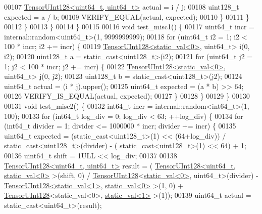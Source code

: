 \begin{DoxyCode}
00107           \hyperlink{struct_eigen_1_1internal_1_1_tensor_u_int128}{TensorUInt128<uint64\_t, uint64\_t>} actual = i / j;
00108           uint128\_t expected = a / b;
00109           VERIFY\_EQUAL(actual, expected);
00110         \}
00111       \}
00112     \}
00113   \}
00114 \}
00115 
00116 \textcolor{keywordtype}{void} test\_misc1() \{
00117   uint64\_t incr = internal::random<uint64\_t>(1, 9999999999);
00118   \textcolor{keywordflow}{for} (uint64\_t i2 = 1; i2 < 100 * incr; i2 += incr) \{
00119     \hyperlink{struct_eigen_1_1internal_1_1_tensor_u_int128}{TensorUInt128<static\_val<0>}, uint64\_t> i(0, i2);
00120     uint128\_t a = \textcolor{keyword}{static\_cast<}uint128\_t\textcolor{keyword}{>}(i2);
00121     \textcolor{keywordflow}{for} (uint64\_t j2 = 1; j2 < 100 * incr; j2 += incr) \{
00122       \hyperlink{struct_eigen_1_1internal_1_1_tensor_u_int128}{TensorUInt128<static\_val<0>}, uint64\_t> j(0, j2);
00123       uint128\_t b = \textcolor{keyword}{static\_cast<}uint128\_t\textcolor{keyword}{>}(j2);
00124       uint64\_t actual = (i * j).upper();
00125       uint64\_t expected = (a * b) >> 64;
00126       VERIFY\_IS\_EQUAL(actual, expected);
00127     \}
00128   \}
00129 \}
00130 
00131 \textcolor{keywordtype}{void} test\_misc2() \{
00132   int64\_t incr = internal::random<int64\_t>(1, 100);
00133   \textcolor{keywordflow}{for} (int64\_t log\_div = 0; log\_div < 63; ++log\_div) \{
00134     \textcolor{keywordflow}{for} (int64\_t divider = 1; divider <= 1000000 * incr; divider += incr) \{
00135       uint64\_t expected = (\textcolor{keyword}{static\_cast<}uint128\_t\textcolor{keyword}{>}(1) << (64+log\_div)) / static\_cast<uint128\_t>(divider) - (\textcolor{keyword}{
      static\_cast<}uint128\_t\textcolor{keyword}{>}(1) << 64) + 1;
00136       uint64\_t shift = 1ULL << log\_div;
00137 
00138       \hyperlink{struct_eigen_1_1internal_1_1_tensor_u_int128}{TensorUInt128<uint64\_t, uint64\_t>} result = (
      \hyperlink{struct_eigen_1_1internal_1_1_tensor_u_int128}{TensorUInt128<uint64\_t, static\_val<0>} >(shift, 0) / 
      \hyperlink{struct_eigen_1_1internal_1_1_tensor_u_int128}{TensorUInt128}<\hyperlink{struct_eigen_1_1internal_1_1static__val}{static\_val<0>}, uint64\_t>(divider) - 
      \hyperlink{struct_eigen_1_1internal_1_1_tensor_u_int128}{TensorUInt128<static\_val<1>}, \hyperlink{struct_eigen_1_1internal_1_1static__val}{static\_val<0>} >(1, 0) + 
      \hyperlink{struct_eigen_1_1internal_1_1_tensor_u_int128}{TensorUInt128}<static\_val<0>, \hyperlink{struct_eigen_1_1internal_1_1static__val}{static\_val<1>} >(1));
00139       uint64\_t actual = \textcolor{keyword}{static\_cast<}uint64\_t\textcolor{keyword}{>}(result);

\end{DoxyCode}
